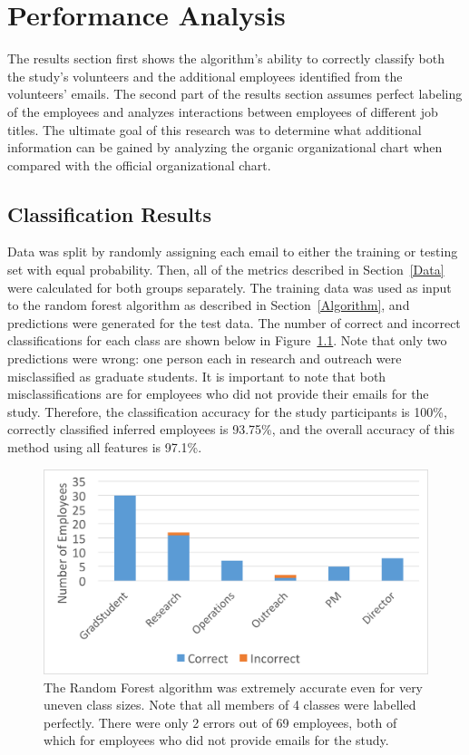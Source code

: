 \documentclass[12pt]{report}
\begin{document}
\chapter{Performance Analysis} \label{Performance}
The results section first shows the algorithm's ability to correctly classify both the study's volunteers and the additional employees identified from the volunteers' emails.
The second part of the results section assumes perfect labeling of the employees and analyzes interactions between employees of different job titles.
The ultimate goal of this research was to determine what additional information can be gained by analyzing the organic organizational chart when compared with the official organizational chart.

\section{Classification Results}
Data was split by randomly assigning each email to either the training or testing set with equal probability.
Then, all of the metrics described in Section~\ref{Data} were calculated for both groups separately.
The training data was used as input to the random forest algorithm as described in Section~\ref{Algorithm}, and predictions were generated for the test data.
The number of correct and incorrect classifications for each class are shown below in Figure~\ref{fig:result_hist}.
Note that only two predictions were wrong: one person each in research and outreach were misclassified as graduate students.
It is important to note that both  misclassifications are for employees who did not provide their emails for the study.
Therefore, the classification accuracy for the study participants is 100\%, correctly classified inferred employees is 93.75\%, and the overall accuracy of this method using all features is 97.1\%.

\begin{figure}[t]
    \centering
    \includegraphics[width=\columnwidth,trim={1mm 2mm 1mm 3mm},clip]{Prediction_50_50_RF}
    \vspace{-20pt}
    \caption[Classification results]{The Random Forest algorithm was extremely accurate even for very uneven class sizes.  Note that all members of 4 classes were labelled perfectly.  There were only 2 errors out of 69 employees, both of which for employees who did not provide emails for the study.}
    \label{fig:result_hist}
\end{figure}
\end{document}
